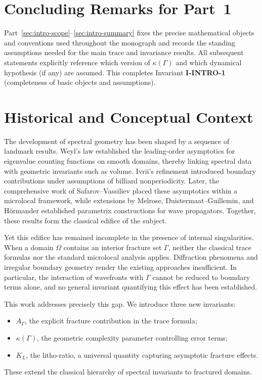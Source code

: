 \section{Concluding Remarks for Part~1}
\label{sec:intro-part1-closure}

Part~\ref{sec:intro-scope}–\ref{sec:intro-summary} fixes the precise mathematical
objects and conventions used throughout the monograph and records the standing
assumptions needed for the main trace and invariance results. All subsequent
statements explicitly reference which version of $\kappa(\Gamma)$ and which
dynamical hypothesis (if any) are assumed. This completes Invariant
\textbf{I-INTRO-1} (completeness of basic objects and assumptions).


\section{Historical and Conceptual Context}

The development of spectral geometry has been shaped by a sequence of landmark results. 
Weyl’s law established the leading-order asymptotics for eigenvalue counting functions 
on smooth domains, thereby linking spectral data with geometric invariants such as volume. 
Ivrii’s refinement introduced boundary contributions under assumptions of billiard 
nonperiodicity. Later, the comprehensive work of Safarov–Vassiliev placed these 
asymptotics within a microlocal framework, while extensions by Melrose, Duistermaat–Guillemin, 
and Hörmander established parametrix constructions for wave propagators. 
Together, these results form the classical edifice of the subject.

Yet this edifice has remained incomplete in the presence of internal singularities. 
When a domain $\Omega$ contains an interior fracture set $\Gamma$, 
neither the classical trace formulas nor the standard microlocal analysis applies. 
Diffraction phenomena and irregular boundary geometry render the existing approaches 
insufficient. In particular, the interaction of wavefronts with $\Gamma$ cannot be 
reduced to boundary terms alone, and no general invariant quantifying this effect 
has been established.

This work addresses precisely this gap. We introduce three new invariants:
\begin{itemize}
    \item $A_\Gamma$, the explicit fracture contribution in the trace formula;
    \item $\kappa(\Gamma)$, the geometric complexity parameter controlling error terms;
    \item $K_L$, the litho-ratio, a universal quantity capturing asymptotic fracture effects.
\end{itemize}
These extend the classical hierarchy of spectral invariants to fractured domains. 

